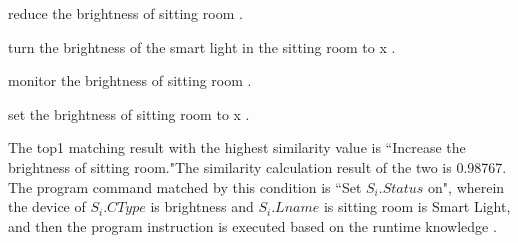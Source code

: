 reduce the brightness of sitting room .

turn the brightness of the smart light in the sitting room to x .

monitor the brightness of sitting room .

set the brightness of sitting room to x .

The top1 matching result with the highest similarity value is ``Increase the brightness of sitting room."The similarity calculation result of the two is 0.98767.
The program command matched by this condition is ``Set $S_{i}.Status$ on", wherein the device of $S_{i}.CType$ is brightness and $S_{i}.Lname$ is sitting room is Smart Light, and then the program instruction is executed based on the runtime knowledge .


